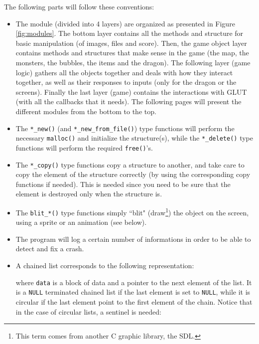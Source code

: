 \documentclass[12pt,a4paper]{article}
\newcommand{\cc}[1]{\texttt{#1}}
\begin{document}
The following parts will follow these conventions:

\begin{itemize}
\item The module (divided into 4 layers) are organized as presented in Figure \ref{fig:modules}. The bottom layer contains all the methods and structure for basic manipulation (of images, files and score). Then, the game object layer contains methods and structures that make sense in the game (the map, the monsters, the bubbles, the items and the dragon). The following layer (game logic) gathers all the objects together and deals with how they interact together, as well as their responses to inputs (only for the dragon or the screens). Finally the last layer (game) contains the interactions with GLUT (with all the callbacks that it needs). The following pages will present the different modules from the bottom to the top.
\item The \cc{*_new()}  (and \cc{*_new_from_file()}) type functions will perform the necessary \cc{malloc()} and initialize the structure(s), while the \cc{*_delete()} type functions will perform the required \cc{free()}'s. 
\item The \cc{*_copy()} type functions copy a structure to another, and take care to copy the element of the structure correctly (by using the corresponding copy functions if needed). This is needed since you need to be sure that the element is destroyed only when the structure is.
\item  The \cc{blit_*()} type functions simply ``blit" (draw\footnote{This term comes from another C graphic library, the SDL.}) the object on the screen, using a sprite or an animation (see below). 
\item The program will log a certain number of informations in order to be able to detect and fix a crash.
\item A chained list corresponds to the following representation:\begin{center}
\end{center}
where \cc{data} is a block of data and  a pointer to the next element of the list. It is a \cc{NULL} terminated chained list if the last element is set to \cc{NULL}, while it is circular if the last element point to the first element of the chain. Notice that in the case of circular lists, a sentinel is needed: \begin{center}
\end{center}
\end{itemize}
\end{document}
